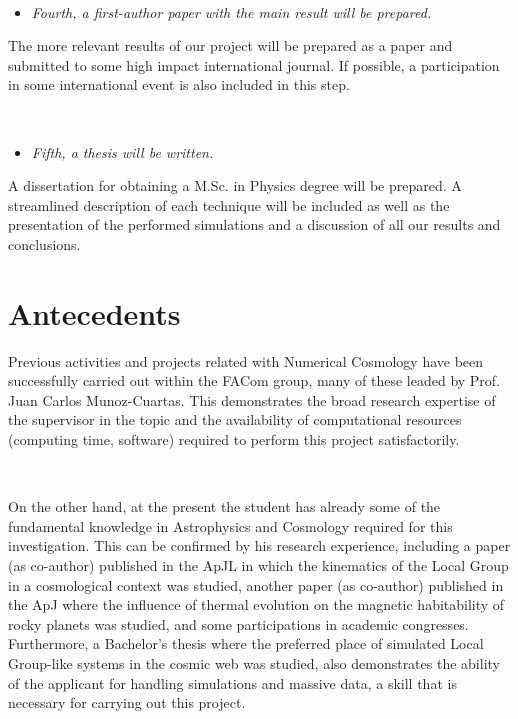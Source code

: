 \documentclass[a4,useAMS,usenatbib,usegraphicx,12pt]{article}
\begin{document}
\

\begin{itemize}
\item[\checkmark] \textit{Fourth, a first-author paper with the main result will
be prepared.}
\end{itemize}


The more relevant results of our project will be prepared as a paper and 
submitted to some high impact international journal. If possible, a participation
in some international event is also included in this step.

\

\begin{itemize}
\item[\checkmark] \textit{Fifth, a thesis will be written.}
\end{itemize}


A dissertation for obtaining a M.Sc. in Physics degree will be prepared. A
streamlined description of each technique will be included as well as the 
presentation of the performed simulations and a discussion of all our results
and conclusions.


\section{Antecedents}
Previous activities and projects related with Numerical Cosmology have been 
successfully carried out within the FACom group, many of these leaded by Prof. 
Juan Carlos Munoz-Cuartas. This demonstrates the broad research expertise of the 
supervisor in the topic and the availability of computational resources (computing
time, software) required to perform this project satisfactorily.

\

On the other hand, at the present the student has already some of the fundamental 
knowledge in Astrophysics and Cosmology required for this investigation. This can 
be confirmed by his research experience, including a paper (as co-author) 
published in the ApJL in which the kinematics of the Local Group in a cosmological 
context was studied, another paper (as co-author) published in the ApJ where the 
influence of thermal evolution on the magnetic habitability of rocky planets was 
studied, and some participations in academic congresses. Furthermore, a Bachelor’s 
thesis where the preferred place of simulated Local Group-like systems in the 
cosmic web was studied, also demonstrates the ability of the applicant for 
handling simulations and massive data, a skill that is necessary for carrying out 
this project.
\end{document}
